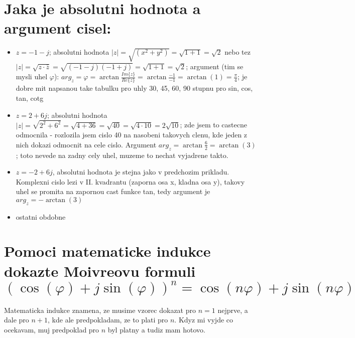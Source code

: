 \section{Jaka je absolutni hodnota a argument cisel:}
\begin{itemize}
\item $z=-1-j$; absolutni hodnota $|z|=\sqrt{(x^2+y^2)}= \sqrt{1+1}=\sqrt{2}$ nebo tez $|z|=\sqrt{z\cdot \bar{z}} = \sqrt{(-1-j)(-1+j)}=\sqrt{1+1}=\sqrt{2}$; argument (tim se mysli uhel $\varphi$): $arg_z = \varphi = \operatorname{arctan}\frac{Im\{z\}}{Re\{z\}}= \operatorname{arctan}\frac{-1}{-1} = \operatorname{arctan}(1) = \frac{\pi}{4}$; je dobre mit napsanou take tabulku pro uhly 30, 45, 60, 90 stupnu pro sin, cos, tan, cotg
\item $z=2+6j$; absolutni hodnota $|z|=\sqrt{2^2+6^2}=\sqrt{4+36}=\sqrt{40}=\sqrt{4\cdot 10}=2\sqrt{10}$; zde jsem to castecne odmocnila - rozlozila jsem cislo 40 na nasobeni takovych clenu, kde jeden z nich dokazi odmocnit na cele cislo. Argument $arg_z = \operatorname{arctan}\frac{6}{2}=\operatorname{arctan}(3)$; toto nevede na zadny cely uhel, muzeme to nechat vyjadrene takto.
\item $z=-2+6j$, absolutni hodnota je stejna jako v predchozim prikladu. Komplexni cislo lezi v II. kvadrantu (zaporna osa x, kladna osa y), takovy uhel se promita na zapornou cast funkce tan, tedy argument je $arg_z = - \operatorname{arctan}(3)$
\item ostatni obdobne
\end{itemize}

\section{Pomoci matematicke indukce dokazte Moivreovu formuli $(\operatorname{cos}(\varphi)+j\operatorname{sin}(\varphi))^n=\operatorname{cos}(n\varphi)+j\operatorname{sin}(n\varphi)$}

Matematicka indukce znamena, ze musime vzorec dokazat pro $n=1$ nejprve, a dale pro $n+1$, kde ale predpokladam, ze to plati pro $n$. Kdyz mi vyjde co ocekavam, muj predpoklad pro $n$ byl platny a tudiz mam hotovo.

